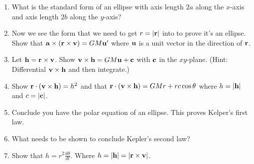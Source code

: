 \documentclass[11pt]{article}
\newcommand{\bu}{{\bf u }}
\newcommand{\bv}{{\bf v }}
\newcommand{\ba}{{\bf a }}
\newcommand{\bc}{{\bf c }}
\newcommand{\br}{{\bf r }}
\newcommand{\bh}{{\bf h }}
\begin{document}
\begin{enumerate}
\item What is the standard form of an ellipse with axis length $2a$ along the $x$-axis and axis length $2b$ along the $y$-axis?


\item Now we see the form that we need to get $r= |\br|$ into to prove it's an ellipse. Show that $\ba \times (\br \times \bv) = GM\bu'$ where $\bu$ is a unit vector in the direction of $\br$.


\item Let $\bh = \br \times \bv$. Show $\bv \times \bh = GM\bu + \bc$ with $\bc$ in the $xy$-plane. (Hint: Differential $\bv \times \bh$ and then integrate.)

\item Show $\br \cdot( \bv \times \bh) = h^2$ and that $\br \cdot ( \bv \times \bh) = GMr + rc\cos \theta$ where $h = |\bh|$ and $c=|\bc|$.

\item Conclude you have the polar equation of an ellipse. This proves Kelper's first law.

\newpage


\item What needs to be shown to conclude Kepler's second law?

\item Show that $\displaystyle h = r^2 \frac{d\theta}{dt}$. Where $h = |\bh| = |\br \times \bv|$.


\end{enumerate}
\end{document}
